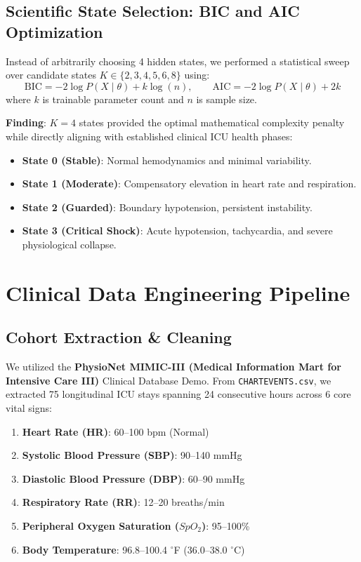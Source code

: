 \documentclass[11pt,a4paper]{article}
\begin{document}
\subsection{Scientific State Selection: BIC and AIC Optimization}
Instead of arbitrarily choosing 4 hidden states, we performed a statistical sweep over candidate states $K \in \{2, 3, 4, 5, 6, 8\}$ using:
\begin{equation}
    \text{BIC} = -2 \log P(X \mid \theta) + k \log(n), \qquad \text{AIC} = -2 \log P(X \mid \theta) + 2k
\end{equation}
where $k$ is trainable parameter count and $n$ is sample size. 

\textbf{Finding}: $K = 4$ states provided the optimal mathematical complexity penalty while directly aligning with established clinical ICU health phases:
\begin{itemize}
    \item \textbf{State 0 (Stable)}: Normal hemodynamics and minimal variability.
    \item \textbf{State 1 (Moderate)}: Compensatory elevation in heart rate and respiration.
    \item \textbf{State 2 (Guarded)}: Boundary hypotension, persistent instability.
    \item \textbf{State 3 (Critical Shock)}: Acute hypotension, tachycardia, and severe physiological collapse.
\end{itemize}

\section{Clinical Data Engineering Pipeline}

\subsection{Cohort Extraction \& Cleaning}
We utilized the \textbf{PhysioNet MIMIC-III (Medical Information Mart for Intensive Care III)} Clinical Database Demo. From \texttt{CHARTEVENTS.csv}, we extracted 75 longitudinal ICU stays spanning 24 consecutive hours across 6 core vital signs:
\begin{enumerate}
    \item \textbf{Heart Rate (HR)}: 60--100 bpm (Normal)
    \item \textbf{Systolic Blood Pressure (SBP)}: 90--140 mmHg
    \item \textbf{Diastolic Blood Pressure (DBP)}: 60--90 mmHg
    \item \textbf{Respiratory Rate (RR)}: 12--20 breaths/min
    \item \textbf{Peripheral Oxygen Saturation ($SpO_2$)}: 95--100\%
    \item \textbf{Body Temperature}: 96.8--100.4 $^\circ$F (36.0--38.0 $^\circ$C)
\end{enumerate}
\end{document}
